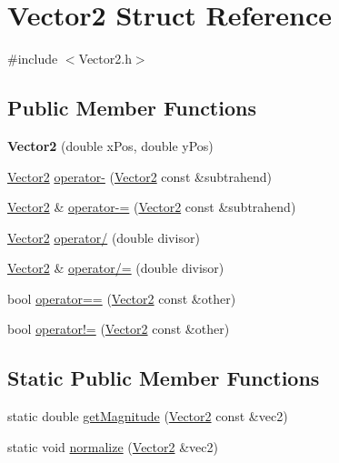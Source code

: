 \hypertarget{structVector2}{}\section{Vector2 Struct Reference}
\label{structVector2}


{\ttfamily \#include $<$Vector2.\+h$>$}

\subsection*{Public Member Functions}
\begin{DoxyCompactItemize}
\item 
\mbox{\label{structVector2_a7d5805ff435328f0f0b70cad670c3d0d}} 
{\bfseries Vector2} (double x\+Pos, double y\+Pos)
\item 
\hyperlink{structVector2}{Vector2} \hyperlink{structVector2_a3329f629c89b6627014a407b378933c8}{operator-\/} (\hyperlink{structVector2}{Vector2} const \&subtrahend)
\item 
\hyperlink{structVector2}{Vector2} \& \hyperlink{structVector2_a32660b671e4f349d8c800d9b7532478a}{operator-\/=} (\hyperlink{structVector2}{Vector2} const \&subtrahend)
\item 
\hyperlink{structVector2}{Vector2} \hyperlink{structVector2_af1f28daf513fd4ac8c35b01a9b35ea62}{operator/} (double divisor)
\item 
\hyperlink{structVector2}{Vector2} \& \hyperlink{structVector2_a5d78350983e3b01a226600a498be077e}{operator/=} (double divisor)
\item 
bool \hyperlink{structVector2_afcebc6a4ad7b13fe193e84610e276a4d}{operator==} (\hyperlink{structVector2}{Vector2} const \&other)
\item 
bool \hyperlink{structVector2_af967d99b507dae58826def2a2552daac}{operator!=} (\hyperlink{structVector2}{Vector2} const \&other)
\end{DoxyCompactItemize}
\subsection*{Static Public Member Functions}
\begin{DoxyCompactItemize}
\item 
static double \hyperlink{structVector2_a6fe46469c9fabf6eb2b53b090153bb66}{get\+Magnitude} (\hyperlink{structVector2}{Vector2} const \&vec2)
\item 
static void \hyperlink{structVector2_a10861942534b8e5179034bd4b7f635ce}{normalize} (\hyperlink{structVector2}{Vector2} \&vec2)
\end{DoxyCompactItemize}
